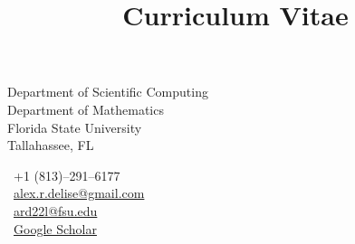 \documentclass[11pt,letterpaper]{moderncv}
\title{Curriculum Vitae}
\begin{document}
\maketitle

\vspace{-2ex}
\begin{minipage}[t]{0.62\textwidth}
  \small
  \vspace{0.25em}
  Department of Scientific Computing \\
  Department of Mathematics \\
  Florida State University \\
  Tallahassee, FL
\end{minipage}%
\hfill
\begin{minipage}[t]{0.36\textwidth}
  \small
  \vspace{0.25em}
  \phonesymbol~+1 (813)--291--6177\\
  \emailsymbol~\href{mailto:alex.r.delise@gmail.com}{alex.r.delise@gmail.com}\\
  \emailsymbol~\href{mailto:ard22l@fsu.edu}{ard22l@fsu.edu}\\
  \Mundus~\href{https://scholar.google.com/citations?user=Yye1qVoAAAAJ&hl=en}{Google Scholar}
\end{minipage}

\vspace{2ex}







\end{document}
